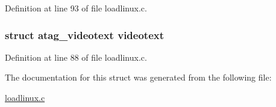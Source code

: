 \-Definition at line 93 of file loadlinux.\-c.

\hypertarget{structatag_a7ad6fedc71b884606da461f8c80aed71}{
\subsubsection[{videotext}]{\setlength{\rightskip}{0pt plus 5cm}struct {\bf atag\-\_\-videotext} {\bf videotext}}}\label{structatag_a7ad6fedc71b884606da461f8c80aed71}


\-Definition at line 88 of file loadlinux.\-c.



\-The documentation for this struct was generated from the following file\-:\begin{DoxyCompactItemize}
\item 
\hyperlink{loadlinux_8c}{loadlinux.\-c}\end{DoxyCompactItemize}
